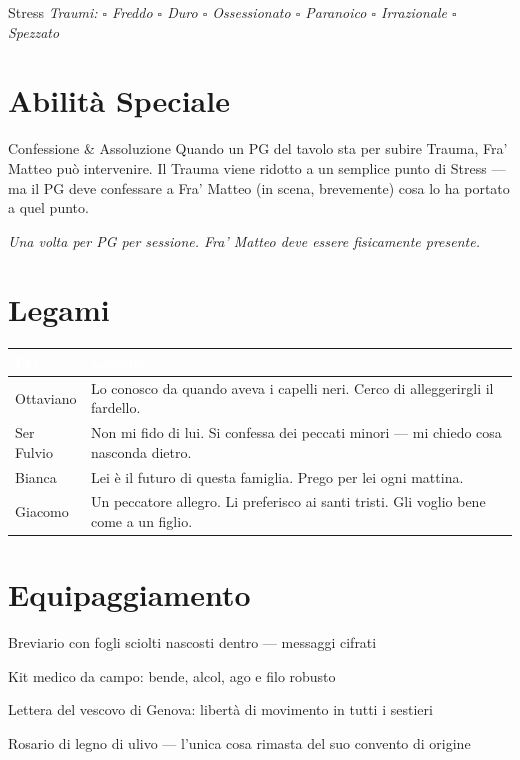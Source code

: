 \medskip
\begin{pgclockbox}{Stress \hfill {}}
  \small\textit{Traumi: $\square$ Freddo \quad $\square$ Duro \quad $\square$ Ossessionato \quad $\square$ Paranoico \quad $\square$ Irrazionale \quad $\square$ Spezzato}
\end{pgclockbox}

\section*{Abilità Speciale}
\begin{doriabox}{Confessione \& Assoluzione}
  Quando un PG del tavolo sta per subire Trauma, Fra' Matteo può intervenire.
  Il Trauma viene ridotto a un semplice punto di Stress — ma il PG deve
  confessare a Fra' Matteo (in scena, brevemente) cosa lo ha portato a quel punto.

  \medskip\noindent\textit{Una volta per PG per sessione. Fra' Matteo deve essere fisicamente presente.}
\end{doriabox}

\section*{Legami}
\begin{table}[h]
\centering\renewcommand{\arraystretch}{1.4}
\begin{tabularx}{\linewidth}{@{}L{2.4cm} X@{}}
  \toprule{}
  \textcolor{white}{\textbf{PG}} & \textcolor{white}{\textbf{Legame}} \\
  \midrule
  Ottaviano & Lo conosco da quando aveva i capelli neri. Cerco di alleggerirgli il fardello. \\
  Ser Fulvio & Non mi fido di lui. Si confessa dei peccati minori — mi chiedo cosa nasconda dietro. \\
  Bianca & Lei è il futuro di questa famiglia. Prego per lei ogni mattina. \\
  Giacomo & Un peccatore allegro. Li preferisco ai santi tristi. Gli voglio bene come a un figlio. \\
  \bottomrule
\end{tabularx}
\end{table}

\section*{Equipaggiamento}
\begin{goldlist}
  \item Breviario con fogli sciolti nascosti dentro — messaggi cifrati
  \item Kit medico da campo: bende, alcol, ago e filo robusto
  \item Lettera del vescovo di Genova: libertà di movimento in tutti i sestieri
  \item Rosario di legno di ulivo — l'unica cosa rimasta del suo convento di origine
\end{goldlist}

